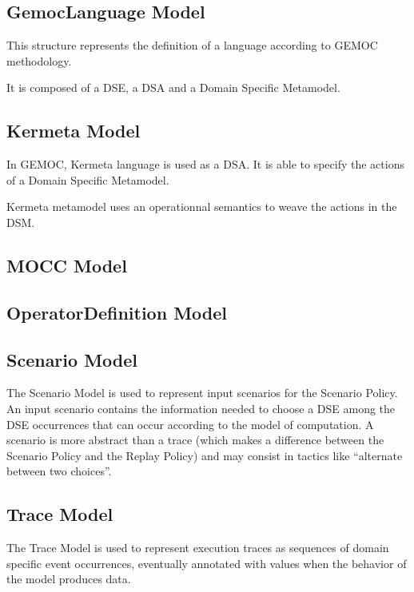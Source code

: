 \documentclass{gemoc} %
\begin{document}
\subsection{GemocLanguage Model}
\label{sec:GemocLanguage_Model}
This structure represents the definition of a language according to GEMOC methodology.

It is composed of a DSE, a DSA and a Domain Specific Metamodel.


\subsection{Kermeta Model}
\label{sec:Kermeta_Model}
In GEMOC, Kermeta language is used as a DSA.
It is able to specify the actions of a Domain Specific Metamodel.

Kermeta metamodel uses an operationnal semantics to weave the actions in the DSM.

\subsection{MOCC Model}
\label{sec:MOCC_Model}

\subsection{OperatorDefinition Model}
\label{sec:OperatorDefinition_Model}


\subsection{Scenario Model}
\label{sec:Scenario_Model}
The Scenario Model is used to represent input scenarios for the Scenario Policy. An input scenario contains the information needed to choose a DSE among the DSE occurrences that can occur according to the model of computation. A scenario is more abstract than a trace (which makes a difference between the Scenario Policy and the Replay Policy) and may consist in tactics like ``alternate between two choices''.

\subsection{Trace Model}
\label{sec:Trace_Model}
The Trace Model is used to represent execution traces as sequences of domain specific event occurrences, eventually annotated with values when the behavior of the model produces data.
\end{document}
